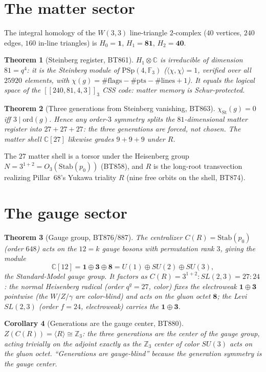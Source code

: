 \documentclass[11pt]{article}
\newtheorem{theorem}{Theorem}
\newtheorem{corollary}[theorem]{Corollary}
\newcommand{\W}{W(3,3)}
\newcommand{\GF}[1]{\mathbb{F}_{#1}}
\newcommand{\PSp}{\mathrm{PSp}}
\newcommand{\Z}{\mathbb{Z}}
\newcommand{\CC}{\mathbb{C}}
\begin{document}
\section{The matter sector}
The integral homology of the $\W$ line-triangle $2$-complex
($40$ vertices, $240$ edges, $160$ in-line triangles) is
$H_0=\mathbf 1$, $H_1=\mathbf{81}$, $H_2=\mathbf{40}$.

\begin{theorem}[Steinberg register, BT861]
$H_1\otimes\CC$ is irreducible of dimension $81=q^4$: it is the
\emph{Steinberg module} of $\PSp(4,\GF3)$
($\langle\chi,\chi\rangle=1$, verified over all $25920$ elements, with
$\chi(g)=\#\mathrm{flags}-\#\mathrm{pts}-\#\mathrm{lines}+1$). It equals
the logical space of the $[[240,81,4,3]]_3$ CSS code: matter memory is
Schur-protected.
\end{theorem}

\begin{theorem}[Three generations from Steinberg vanishing, BT863]
$\chi_{\mathrm{St}}(g)=0$ iff $3\mid\mathrm{ord}(g)$. Hence \emph{any}
order-$3$ symmetry splits the $81$-dimensional matter register into
$27+27+27$: the three generations are forced, not chosen. The matter
shell $\CC[27]$ likewise grades $9+9+9$ under $R$.
\end{theorem}

The $27$ matter shell is a torsor under the Heisenberg group
$N=3^{1+2}=O_3(\mathrm{Stab}(p_0))$ (BT858), and $R$ is the long-root
transvection realizing Pillar~68's Yukawa triality $R$ (nine free orbits
on the shell, BT874).

\section{The gauge sector}
\begin{theorem}[Gauge group, BT876/887]
The centralizer $C(R)=\mathrm{Stab}(p_0)$ (order $648$) acts on the
$12=k$ gauge bosons with permutation rank $3$, giving the module
\[
\CC[12]=\mathbf 1\oplus\mathbf 3\oplus\mathbf 8
=U(1)\oplus SU(2)\oplus SU(3),
\]
the Standard-Model gauge group. It factors as $C(R)=3^{1+2}:SL(2,3)
=27{:}24$: the normal Heisenberg radical (order $q^q=27$, \emph{color})
fixes the electroweak $\mathbf 1\oplus\mathbf 3$ pointwise (the
$W/Z/\gamma$ are color-blind) and acts on the gluon octet $\mathbf 8$;
the Levi $SL(2,3)$ (order $f=24$, \emph{electroweak}) carries the
$\mathbf 1\oplus\mathbf 3$.
\end{theorem}

\begin{corollary}[Generations are the gauge center, BT880]
$Z(C(R))=\langle R\rangle\cong\Z_3$: the three generations are the
center of the gauge group, acting trivially on the adjoint exactly as
the $\Z_3$ center of color $SU(3)$ acts on the gluon octet. ``Generations
are gauge-blind'' because the generation symmetry \emph{is} the gauge
center.
\end{corollary}
\end{document}
